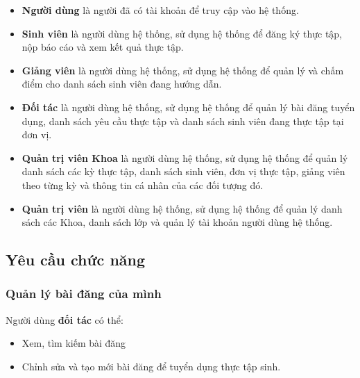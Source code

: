 \documentclass[./../main.tex]{subfiles}
\begin{document}
\begin{itemize}
	\item

	      \textbf{Người dùng} là người đã có tài khoản để truy cập vào hệ thống.

	\item

	      \textbf{Sinh viên} là người dùng hệ thống, sử dụng hệ thống để đăng ký
	      thực tập, nộp báo cáo và xem kết quả thực tập.

	\item

	      \textbf{Giảng viên} là người dùng hệ thống, sử dụng hệ thống để quản
	      lý và chấm điểm cho danh sách sinh viên đang hướng dẫn.

	\item

	      \textbf{Đối tác} là người dùng hệ thống, sử dụng hệ thống để quản lý
	      bài đăng tuyển dụng, danh sách yêu cầu thực tập và danh sách sinh viên
	      đang thực tập tại đơn vị.

	\item

	      \textbf{Quản trị viên Khoa} là người dùng hệ thống, sử dụng hệ thống
	      để quản lý danh sách các kỳ thực tập, danh sách sinh viên, đơn vị thực
	      tập, giảng viên theo từng kỳ và thông tin cá nhân của các đối tượng
	      đó.

	\item

	      \textbf{Quản trị viên} là người dùng hệ thống, sử dụng hệ thống để
	      quản lý danh sách các Khoa, danh sách lớp và quản lý tài khoản người
	      dùng hệ thống.

\end{itemize}

\subsection{Yêu cầu chức năng}

\hypertarget{quux1ea3n-luxfd-buxe0i-ux111ux103ng-cux1ee7a-muxecnh}{%
	\subsubsection{Quản lý bài đăng của
		mình}\label{quux1ea3n-luxfd-buxe0i-ux111ux103ng-cux1ee7a-muxecnh}}

Người dùng \textbf{đối tác} có thể:

\begin{itemize}
	\item

	      Xem, tìm kiếm bài đăng

	\item

	      Chỉnh sửa và tạo mới bài đăng để tuyển dụng thực tập sinh.

\end{itemize}
\end{document}
